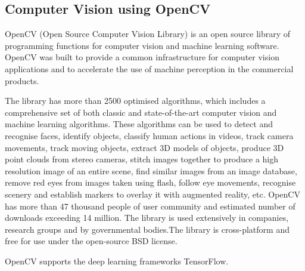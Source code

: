 \documentclass[14pt,a4paper]{article}
\begin{document}
\subsection{Computer Vision using OpenCV}
\par OpenCV (Open Source Computer Vision Library) is an open source library of programming functions for computer vision and machine learning software. OpenCV was built to provide a common infrastructure for computer vision applications and to accelerate the use of machine perception in the commercial products.
\par The library has more than 2500 optimised algorithms, which includes a comprehensive set of both classic and state-of-the-art computer vision and machine learning algorithms. These algorithms can be used to detect and recognise faces, identify objects, classify human actions in videos, track camera movements, track moving objects, extract 3D models of objects, produce 3D point clouds from stereo cameras, stitch images together to produce a high resolution image of an entire scene, find similar images from an image database, remove red eyes from images taken using flash, follow eye movements, recognise scenery and establish markers to overlay it with augmented reality, etc. OpenCV has more than 47 thousand people of user community and estimated number of downloads exceeding 14 million. The library is used extensively in companies, research groups and by governmental bodies.The library is cross-platform and free for use under the open-source BSD license.
\par OpenCV supports the deep learning frameworks TensorFlow.
\end{document}
